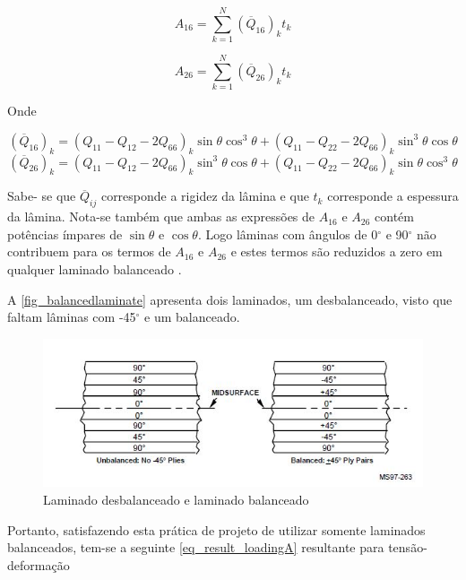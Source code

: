 \begin{equation} \label{eq_A16}
A_{16}
=
\sum_{k=1}^N (\overline{Q}_{16})_k t_k
\end{equation}

\begin{equation} \label{eq_A26}
A_{26}
=
\sum_{k=1}^N (\overline{Q}_{26})_k t_k
\end{equation}

Onde

\begin{equation} \label{eq_Q16}
(\overline{Q}_{16})_k
=
({Q}_{11}-{Q}_{12}-2{Q}_{66})_k \sin\theta \cos^3\theta + ({Q}_{11}-{Q}_{22}-2{Q}_{66})_k \sin^3\theta \cos\theta
\end{equation}
\begin{equation} \label{eq_Q26}
(\overline{Q}_{26})_k
=
({Q}_{11}-{Q}_{12}-2{Q}_{66})_k \sin^3\theta \cos\theta + ({Q}_{11}-{Q}_{22}-2{Q}_{66})_k \sin\theta \cos^3\theta
\end{equation}

Sabe- se que $ \overline{Q}_{ij} $ corresponde a rigidez da lâmina e que $ t_k $ corresponde a espessura da lâmina. Nota-se também que ambas as expressões de $ A_{16} $ e $ A_{26} $ contém potências ímpares de $ \sin\theta $ e $ \cos\theta $. Logo lâminas com ângulos de 0$^{\circ}$ e 90$^{\circ}$ não contribuem para os termos de $ A_{16} $ e $ A_{26} $ e estes termos são reduzidos a zero em qualquer laminado balanceado \cite{nasa1997guidelines}.

A \autoref{fig_balancedlaminate} apresenta dois laminados, um desbalanceado, visto que faltam lâminas com -45$^{\circ}$ e um balanceado.

\begin{figure}[ht]
	\caption{\label{fig_balancedlaminate}Laminado desbalanceado e laminado balanceado}
  \centering
  \includegraphics[scale=1.0]{figura/BalancedLaminate}
\end{figure}

Portanto, satisfazendo esta prática de projeto de utilizar somente laminados balanceados, tem-se a seguinte \autoref{eq_result_loadingA} resultante para tensão-deformação

